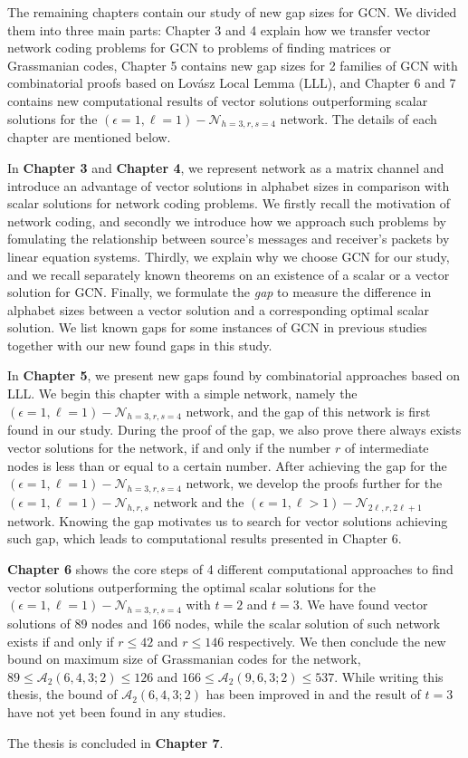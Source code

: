 The remaining chapters contain our study of new gap sizes for GCN.
We divided them into three main parts: Chapter 3 and 4 explain how
we transfer vector network coding problems for GCN to problems of
finding matrices or Grassmanian codes, Chapter 5 contains new gap
sizes for 2 families of GCN with combinatorial proofs based on Lov\'asz
Local Lemma (LLL), and Chapter 6 and 7 contains new computational
results of vector solutions outperforming scalar solutions for the
$\left(\epsilon=1,\ell=1\right)-\mathcal{N}_{h=3,r,s=4}$ network.
The details of each chapter are mentioned below.

In \textbf{Chapter 3} and \textbf{Chapter 4}, we represent network
as a matrix channel and introduce an advantage of vector solutions
in alphabet sizes in comparison with scalar solutions for network
coding problems. We firstly recall the motivation of network coding,
and secondly we introduce how we approach such problems by fomulating
the relationship between source's messages and receiver's packets
by linear equation systems. Thirdly, we explain why we choose GCN
for our study, and we recall separately known theorems on an existence
of a scalar or a vector solution for GCN. Finally, we formulate the
\textit{gap} to measure the difference in alphabet sizes between a
vector solution and a corresponding optimal scalar solution. We list
known gaps for some instances of GCN in previous studies together
with our new found gaps in this study.

In \textbf{Chapter 5}, we present new gaps found by combinatorial
approaches based on LLL. We begin this chapter with a simple network,
namely the $\left(\epsilon=1,\ell=1\right)-\mathcal{N}_{h=3,r,s=4}$
network, and the gap of this network is first found in our study.
During the proof of the gap, we also prove there always exists vector
solutions for the network, if and only if the number $r$ of intermediate
nodes is less than or equal to a certain number. After achieving the
gap for the $\left(\epsilon=1,\ell=1\right)-\mathcal{N}_{h=3,r,s=4}$
network, we develop the proofs further for the $\left(\epsilon=1,\ell=1\right)-\mathcal{N}_{h,r,s}$
network and the $\left(\epsilon=1,\ell>1\right)-\mathcal{N}_{2\ell,r,2\ell+1}$
network. Knowing the gap motivates us to search for vector solutions
achieving such gap, which leads to computational results presented
in Chapter 6.

\textbf{Chapter 6} shows the core steps of 4 different computational
approaches to find vector solutions outperforming the optimal scalar
solutions for the $\left(\epsilon=1,\ell=1\right)-\mathcal{N}_{h=3,r,s=4}$
with $t=2$ and $t=3$. We have found vector solutions of 89 nodes
and 166 nodes, while the scalar solution of such network exists if
and only if $r\leq42$ and $r\leq146$ respectively. We then conclude
the new bound on maximum size of Grassmanian codes for the network,
$89\leq\mathcal{A}_{2}\left(6,4,3;2\right)\leq126$ and $166\leq\mathcal{A}_{2}\left(9,6,3;2\right)\leq537$.
While writing this thesis, the bound of $\mathcal{A}_{2}\left(6,4,3;2\right)$
has been improved in \cite{Etzion:2018} and the result of $t=3$
have not yet been found in any studies. 

The thesis is concluded in \textbf{Chapter 7}. 

\clearpage
